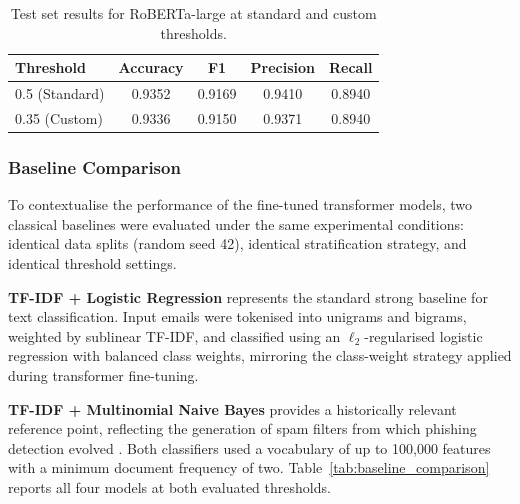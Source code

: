 \begin{table}[htbp]
\centering
\caption{Test set results for \acs{RoBERTa}-large at standard and custom thresholds.}
\label{tab:roberta_results}
\begin{tabular}{lcccc}
\hline
\textbf{Threshold} & \textbf{Accuracy} & \textbf{F1} & \textbf{Precision} & \textbf{Recall} \\
\hline
0.5 (Standard) & 0.9352 & 0.9169 & 0.9410 & 0.8940 \\
0.35 (Custom)  & 0.9336 & 0.9150 & 0.9371 & 0.8940 \\
\hline
\end{tabular}
\end{table}

\subsubsection{Baseline Comparison}
\label{sec:baseline_comparison}

To contextualise the performance of the fine-tuned transformer models, two classical baselines were evaluated under the same experimental conditions: identical data splits (random seed 42), identical stratification strategy, and identical threshold settings.

\textbf{TF-IDF + Logistic Regression} represents the standard strong baseline for text classification. Input emails were tokenised into unigrams and bigrams, weighted by sublinear TF-IDF, and classified using an $\ell_2$-regularised logistic regression with balanced class weights, mirroring the class-weight strategy applied during transformer fine-tuning.

\textbf{TF-IDF + Multinomial Naive Bayes} provides a historically relevant reference point, reflecting the generation of spam filters from which phishing detection evolved \cite{metsis2006spam}. Both classifiers used a vocabulary of up to 100,000 features with a minimum document frequency of two. Table~\ref{tab:baseline_comparison} reports all four models at both evaluated thresholds.

